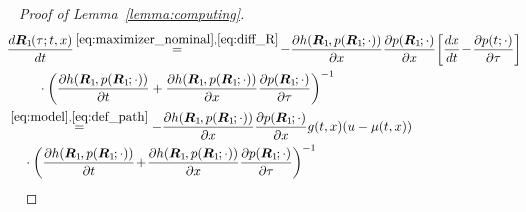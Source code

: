\documentclass[10pt,conference]{ieeeconf}
\renewcommand{\(}{\left(}
\renewcommand{\)}{\right)}
\renewcommand{\[}{\left[}
\renewcommand{\]}{\right]}
\begin{document}
\begin{proof}[Proof of Lemma~\ref{lemma:computing}]
{\begin{align}
    &\hspace{-10pt} \frac{d \boldsymbol{R}_{1\hspace{-1pt}}(\tau;t,x)}{d t} \hspace{-1.5pt}\overset{\eqref{eq:maximizer_nominal},\eqref{eq:diff_R}}{=}\hspace{-1.5pt} -  \frac{\partial h(\boldsymbol{R}_{1\hspace{-1pt}},p(\boldsymbol{R}_{1\hspace{-1pt}};\cdot))}{\partial x} \frac{\partial p(\boldsymbol{R}_{1\hspace{-1pt}};\cdot)}{\partial x} \hspace{-1.5pt}\left[ \frac{dx}{dt} \hspace{-1.5pt}-\hspace{-1.5pt} \frac{\partial p(t;\cdot)}{\partial \tau} \right] \nonumber \\ & \;\;\;\;\; \cdot \left( \frac{\partial h(\boldsymbol{R}_{1\hspace{-1pt}},p(\boldsymbol{R}_{1\hspace{-1pt}};\cdot))}{\partial t}  + \frac{\partial h(\boldsymbol{R}_{1\hspace{-1pt}},p(\boldsymbol{R}_{1\hspace{-1pt}};\cdot))}{\partial x}\frac{\partial p(\boldsymbol{R}_{1\hspace{-1pt}};\cdot)}{\partial \tau} \right)^{-1} \nonumber \\ 
    &\hspace{-10pt}\overset{\eqref{eq:model},\eqref{eq:def_path}}{=} - \frac{\partial h(\boldsymbol{R}_{1\hspace{-1pt}},p(\boldsymbol{R}_{1\hspace{-1pt}};\cdot))}{\partial x} \frac{\partial p(\boldsymbol{R}_{1\hspace{-1pt}};\cdot)}{\partial x} g(t,x)(u - \mu(t,x)) \nonumber \\ &\; \cdot \left( \frac{\partial h(\boldsymbol{R}_{1\hspace{-1pt}},p(\boldsymbol{R}_{1\hspace{-1pt}};\cdot))}{\partial t}  \hspace{-1.5pt}+\hspace{-1.5pt} \frac{\partial h(\boldsymbol{R}_{1\hspace{-1pt}},p(\boldsymbol{R}_{1\hspace{-1pt}};\cdot))}{\partial x}\frac{\partial p(\boldsymbol{R}_{1\hspace{-1pt}};\cdot)}{\partial \tau} \right)^{-1} \hspace{-8pt} \label{eq:final_dR}

\end{align}}
\end{proof}
\end{document}
